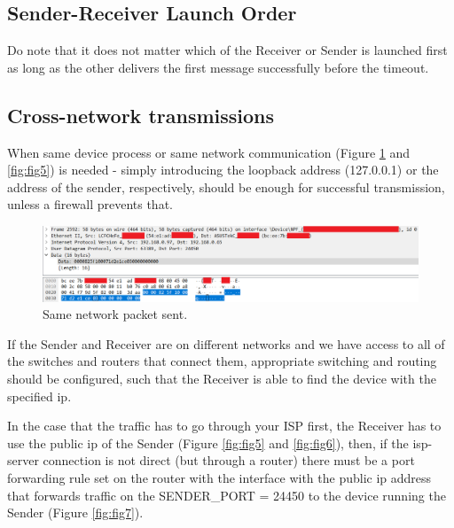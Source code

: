 \documentclass[12pt]{article}
\begin{document}
\subsection{Sender-Receiver Launch Order}

Do note that it does not matter which of the Receiver or Sender is launched first as long as the other delivers the first message successfully before the timeout.

\subsection{Cross-network transmissions}

When same device process or same network communication (Figure \ref{fig:fig4} and \ref{fig:fig5}) is needed - simply introducing the loopback address (127.0.0.1) or the address of the sender, respectively, should be enough for successful transmission, unless a firewall prevents that.

\begin{figure}[!htb]
	\centering
	\includegraphics[width=.9\linewidth]{LocalRequestSend.png}
	\caption{Same network packet sent.}\label{fig:fig4}
\end{figure}

If the Sender and Receiver are on different networks and we have access to all of the switches and routers that connect them, appropriate switching and routing should be configured, such that the Receiver is able to find the device with the specified ip.

In the case that the traffic has to go through your ISP first, the Receiver has to use the public ip of the Sender (Figure \ref{fig:fig5} and \ref{fig:fig6}), then, if the isp-server connection is not direct (but through a router) there must be a port forwarding rule set on the router with the interface with the public ip address that forwards traffic on the SENDER_PORT = 24450 to the device running the Sender (Figure \ref{fig:fig7}).
\end{document}
